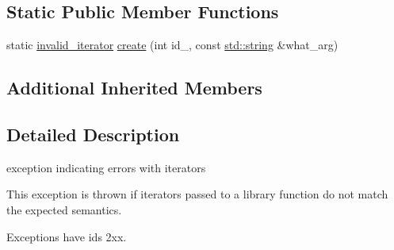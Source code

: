 \subsection*{Static Public Member Functions}
\begin{DoxyCompactItemize}
\item 
static \mbox{\hyperlink{classnlohmann_1_1detail_1_1invalid__iterator}{invalid\+\_\+iterator}} \mbox{\hyperlink{classnlohmann_1_1detail_1_1invalid__iterator_a4e849260a3caa1b288c7e619130c6c09}{create}} (int id\+\_\+, const \mbox{\hyperlink{namespacenlohmann_1_1detail_a1ed8fc6239da25abcaf681d30ace4985ab45cffe084dd3d20d928bee85e7b0f21}{std\+::string}} \&what\+\_\+arg)
\end{DoxyCompactItemize}
\subsection*{Additional Inherited Members}


\subsection{Detailed Description}
exception indicating errors with iterators 

This exception is thrown if iterators passed to a library function do not match the expected semantics.

Exceptions have ids 2xx.

